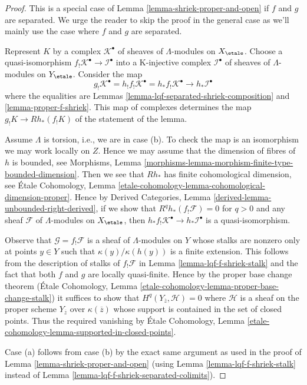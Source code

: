 \begin{proof}
This is a special case of Lemma \ref{lemma-shriek-proper-and-open}
if $f$ and $g$ are separated. We urge the reader to skip the proof
in the general case
as we'll mainly use the case where $f$ and $g$ are separated.

\medskip\noindent
Represent $K$ by a complex $\mathcal{K}^\bullet$ of sheaves of
$\Lambda$-modules on $X_\etale$. Choose a quasi-isomorphism
$f_!\mathcal{K}^\bullet \to \mathcal{I}^\bullet$ into a K-injective
complex $\mathcal{I}^\bullet$ of sheaves of $\Lambda$-modules on $Y_\etale$.
Consider the map
$$
g_!\mathcal{K}^\bullet =
h_!f_!\mathcal{K}^\bullet =
h_*f_!\mathcal{K}^\bullet
\longrightarrow
h_*\mathcal{I}^\bullet
$$
where the equalities are
Lemmas \ref{lemma-lqf-separated-shriek-composition}
and \ref{lemma-proper-f-shriek}. This map of complexes determines the map
$g_!K \to Rh_*(f_!K)$ of the statement of the lemma.

\medskip\noindent
Assume $\Lambda$ is torsion, i.e., we are in case (b). To check the map
is an isomorphism we may work locally on $Z$.
Hence we may assume that the dimension of fibres of $h$ is bounded,
see Morphisms, Lemma
\ref{morphisms-lemma-morphism-finite-type-bounded-dimension}.
Then we see that $Rh_*$ has finite cohomological dimension, see
\'Etale Cohomology, Lemma
\ref{etale-cohomology-lemma-cohomological-dimension-proper}.
Hence by Derived Categories, Lemma \ref{derived-lemma-unbounded-right-derived},
if we show that $R^qh_*(f_!\mathcal{F}) = 0$ for $q > 0$
and any sheaf $\mathcal{F}$ of $\Lambda$-modules on $X_\etale$, then
$h_*f_!\mathcal{K}^\bullet \to h_*\mathcal{I}^\bullet$ is a quasi-isomorphism.

\medskip\noindent
Observe that $\mathcal{G} = f_!\mathcal{F}$ is a sheaf of $\Lambda$-modules
on $Y$ whose stalks are nonzero only at points $y \in Y$ such that
$\kappa(y)/\kappa(h(y))$ is a finite extension. This follows from the
description of stalks of $f_!\mathcal{F}$ in
Lemma \ref{lemma-lqf-f-shriek-stalk}
and the fact that both $f$ and $g$ are locally quasi-finite.
Hence by the proper base change theorem (\'Etale Cohomology, Lemma
\ref{etale-cohomology-lemma-proper-base-change-stalk})
it suffices to show that $H^q(Y_{\overline{z}}, \mathcal{H}) = 0$
where $\mathcal{H}$ is a sheaf on the proper scheme $Y_{\overline{z}}$
over $\kappa(\overline{z})$ whose support is contained in the set
of closed points. Thus the required vanishing by \'Etale Cohomology, Lemma
\ref{etale-cohomology-lemma-supported-in-closed-points}.

\medskip\noindent
Case (a) follows from case (b) by the exact same argument as used
in the proof of Lemma \ref{lemma-shriek-proper-and-open}
(using Lemma \ref{lemma-lqf-f-shriek-stalk} instead of
Lemma \ref{lemma-lqf-f-shriek-separated-colimits}).
\end{proof}







